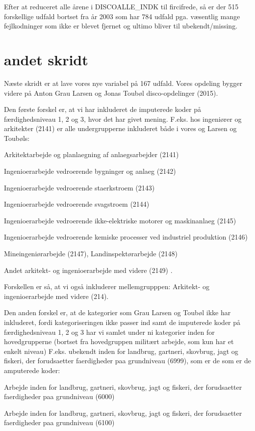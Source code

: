 Efter at reduceret alle årene i DISCOALLE\_INDK til fircifrede, så er der 515 forskellige udfald bortset fra år 2003 som har 784 udfald pga. væsentlig mange fejlkodninger som ikke er blevet fjernet og ultimo bliver til ubekendt/missing.


\section{andet skridt \label{}}

Næste skridt er at lave vores nye variabel på 167 udfald. Vores opdeling bygger videre på Anton Grau Larsen og Jonas Toubøl disco-opdelinger (2015).

Den første forskel er, at vi har inkluderet de imputerede koder på færdighedsniveau 1, 2 og 3, hvor det har givet mening. F.eks. hos ingeniører og arkitekter (2141) er alle undergrupperne inkluderet både i vores og Larsen og Toubøls:
\begin{description}
  \item Arkitektarbejde og planlaegning af anlaegsarbejder (2141)
  \item Ingenioerarbejde vedroerende bygninger og anlaeg (2142)
  \item Ingenioerarbejde vedroerende staerkstroem (2143)
  \item Ingenioerarbejde vedroerende svagstroem (2144)
  \item Ingenioerarbejde vedroerende ikke-elektriske motorer og maskinanlaeg (2145) 
  \item Ingenioerarbejde vedroerende kemiske processer ved industriel produktion (2146)
  \item Mineingeniørarbejde (2147), Landinspektørarbejde (2148)
  \item Andet arkitekt- og ingenioerarbejde med videre (2149) .
\end{description}
Forskellen er så, at vi også inkluderer mellemgrupppen: Arkitekt- og ingenioerarbejde med videre (214).

Den anden forskel er, at de kategorier som Grau Larsen og Toubøl ikke har inkluderet, fordi kategoriseringen ikke passer ind samt de imputerede koder på færdighedsniveau 1, 2 og 3 har vi samlet under ni kategorier inden for hovedgrupperne (bortset fra hovedgruppen militært arbejde, som kun har et enkelt niveau) F.eks. ubekendt inden for landbrug, gartneri, skovbrug, jagt og fiskeri, der forudsaetter faerdigheder paa grundniveau (6999), som er de som er de amputerede koder:
\begin{description}
  \item Arbejde inden for landbrug, gartneri, skovbrug, jagt og fiskeri, der forudsaetter faerdigheder paa grundniveau (6000)
  \item Arbejde inden for landbrug, gartneri, skovbrug, jagt og fiskeri, der forudsaetter faerdigheder paa grundniveau (6100)
\end{description}

